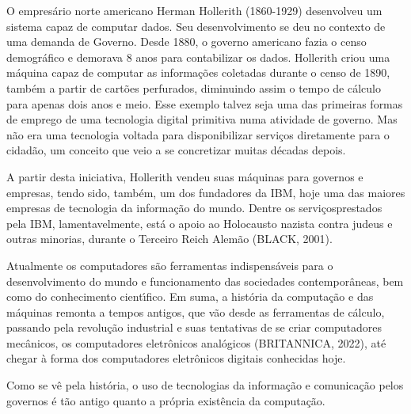 \documentclass[
12pt,		%
openright,	%
twoside,  %
a4paper,			%
chapter=TITLE,		%
english,			%
french,				%
spanish,			%
brazil				%
]{USPSC-classe/USPSC}
\begin{document}
O empres\'ario norte americano Herman Hollerith (1860-1929) desenvolveu um sistema capaz de computar dados. Seu desenvolvimento se deu no contexto de uma demanda de Governo. Desde 1880, o governo americano fazia o censo demogr\'afico e demorava 8 anos para contabilizar os dados. Hollerith criou uma m\'aquina capaz de computar as informa\c{c}\~oes coletadas durante o censo de 1890, tamb\'em a partir de cart\~oes perfurados, diminuindo assim o tempo de c\'alculo para apenas dois anos e meio. Esse exemplo talvez seja uma das primeiras formas de emprego de uma tecnologia digital primitiva numa atividade de governo. Mas n\~ao era uma tecnologia voltada para disponibilizar servi\c{c}os diretamente para o cidad\~ao, um conceito que veio a se concretizar muitas d\'ecadas depois.




A partir desta iniciativa, Hollerith vendeu suas m\'aquinas para governos e empresas, tendo sido, tamb\'em, um dos fundadores da IBM, hoje uma das maiores empresas de tecnologia da informa\c{c}\~ao do mundo. Dentre os \textquotedbl servi\c{c}os\textquotedbl  prestados pela IBM, lamentavelmente, est\'a o apoio ao Holocausto nazista contra judeus e outras minorias, durante o Terceiro Reich Alem\~ao  (BLACK, 2001).




Atualmente os computadores s\~ao ferramentas indispens\'aveis para o desenvolvimento do mundo e funcionamento das sociedades contempor\^aneas, bem como do conhecimento cient\'{\i}fico. Em suma, a hist\'oria da computa\c{c}\~ao e das m\'aquinas remonta a tempos antigos, que v\~ao desde as ferramentas de c\'alculo, passando pela revolu\c{c}\~ao industrial e suas tentativas de se criar computadores mec\^anicos, os computadores eletr\^onicos anal\'ogicos  (BRITANNICA, 2022), at\'e chegar \`a forma dos computadores eletr\^onicos digitais conhecidas hoje.




Como se v\^e pela hist\'oria, o uso de tecnologias da informa\c{c}\~ao e comunica\c{c}\~ao pelos governos \'e t\~ao antigo quanto a pr\'opria exist\^encia da computa\c{c}\~ao.
\end{document}
